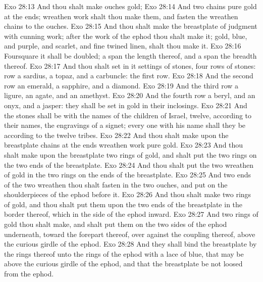\vs Exo 28:13 And thou shalt make ouches  gold;
\vs Exo 28:14 And two chains  pure gold at the ends;  wreathen work shalt thou make them, and fasten the wreathen chains to the ouches.
\vs Exo 28:15 And thou shalt make the breastplate of judgment with cunning work; after the work of the ephod thou shalt make it;  gold,  blue, and  purple, and  scarlet, and  fine twined linen, shalt thou make it.
\vs Exo 28:16 Foursquare it shall be  doubled; a span  the length thereof, and a span  the breadth thereof.
\vs Exo 28:17 And thou shalt set in it settings of stones,  four rows of stones:  row  a sardius, a topaz, and a carbuncle:  the first row.
\vs Exo 28:18 And the second row  an emerald, a sapphire, and a diamond.
\vs Exo 28:19 And the third row a ligure, an agate, and an amethyst.
\vs Exo 28:20 And the fourth row a beryl, and an onyx, and a jasper: they shall be set in gold in their inclosings.
\vs Exo 28:21 And the stones shall be with the names of the children of Israel, twelve, according to their names,  the engravings of a signet; every one with his name shall they be according to the twelve tribes.
\vs Exo 28:22 And thou shalt make upon the breastplate chains at the ends  wreathen work  pure gold.
\vs Exo 28:23 And thou shalt make upon the breastplate two rings of gold, and shalt put the two rings on the two ends of the breastplate.
\vs Exo 28:24 And thou shalt put the two wreathen  of gold in the two rings  on the ends of the breastplate.
\vs Exo 28:25 And  two ends of the two wreathen  thou shalt fasten in the two ouches, and put  on the shoulderpieces of the ephod before it.
\vs Exo 28:26 And thou shalt make two rings of gold, and thou shalt put them upon the two ends of the breastplate in the border thereof, which  in the side of the ephod inward.
\vs Exo 28:27 And two  rings of gold thou shalt make, and shalt put them on the two sides of the ephod underneath, toward the forepart thereof, over against the  coupling thereof, above the curious girdle of the ephod.
\vs Exo 28:28 And they shall bind the breastplate by the rings thereof unto the rings of the ephod with a lace of blue, that  may be above the curious girdle of the ephod, and that the breastplate be not loosed from the ephod.
